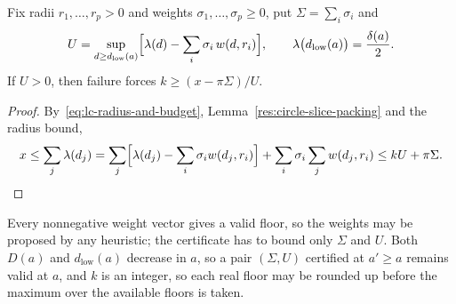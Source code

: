 \documentclass[11pt]{article}
\begin{document}
\begin{theorem}\label{res:dual-arity-floor}
Fix radii $r_1,\ldots,r_p>0$ and weights $\sigma_1,\ldots,\sigma_p\ge0$, put
$\Sigma=\sum_i\sigma_i$ and
\[
 U=\sup_{d\ge d_{\mathrm{low}}(a)}
   \Bigl[\lambda(d)-\sum_i\sigma_i\,w(d,r_i)\Bigr],
 \qquad
 \lambda\bigl(d_{\mathrm{low}}(a)\bigr)=\frac{\delta(a)}2 .
\]
If $U>0$, then failure forces $k\ge(x-\pi\Sigma)/U$.
\end{theorem}

\begin{proof}
By~\eqref{eq:lc-radius-and-budget}, Lemma~\ref{res:circle-slice-packing} and
the radius bound,
\[
 x\le\sum_j\lambda(d_j)
  =\sum_j\Bigl[\lambda(d_j)-\sum_i\sigma_i w(d_j,r_i)\Bigr]
    +\sum_i\sigma_i\sum_j w(d_j,r_i)
  \le kU+\pi\Sigma. \qedhere
\]
\end{proof}

Every nonnegative weight vector gives a valid floor, so the weights may be
proposed by any heuristic; the certificate has to bound only $\Sigma$ and $U$.
Both $D(a)$ and $d_{\mathrm{low}}(a)$ decrease in $a$, so a pair
$(\Sigma,U)$ certified at $a'\ge a$ remains valid at $a$, and $k$ is an
integer, so each real floor may be rounded up before the maximum over the
available floors is taken.
\end{document}
